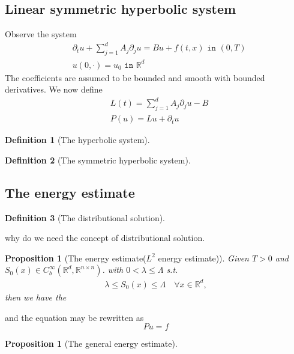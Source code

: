 \documentclass[a4paper,11pt,oneside,fleqn]{book}
\newtheorem{proposition}[theorem]{Proposition}
\theoremstyle{definition}
\newtheorem{definition}{Definition}[section]
\theoremstyle{remark}
\begin{document}
\subsection{Linear symmetric hyperbolic system}
Observe the system
\begin{align*}
	& \partial_t u + \sum_{j = 1}^d A_j \partial_j u = Bu + f(t, x) \texttt{ in } (0, T)\\
	& u(0, \cdot) = u_0 \texttt{ in } \mathbb{R}^d
\end{align*}
The coefficients are assumed to be bounded and smooth with bounded derivatives. We now define 
\begin{align*}
	& L(t) = \sum_{j = 1}^d A_j \partial_j u - B\\
	& P(u) = Lu + \partial_t u
\end{align*}

\begin{definition}[The hyperbolic system]
\end{definition}

\begin{definition}[The symmetric hyperbolic system]
\end{definition}



\subsection{The energy estimate}
\begin{definition}[The distributional solution]
\end{definition}
why do we need the concept of distributional solution. 

\begin{proposition}[The energy estimate($L^2$ energy estimate)]
	Given $T > 0$ and $S_0(x) \in C_b^\infty(\mathbb{R}^d, \mathbb{R}^{n \times n})$. with $0 < \lambda \le \Lambda$ s.t. 
	\begin{align*}
		\lambda \le S_0(x) \le \Lambda \quad \forall x \in \mathbb{R}^d,
	\end{align*}
	then we have the  
\end{proposition}
and the equation may be rewritten as 
\begin{equation}
	Pu = f
\end{equation}

\begin{proposition}[The general energy estimate]
\end{proposition}
\end{document}
